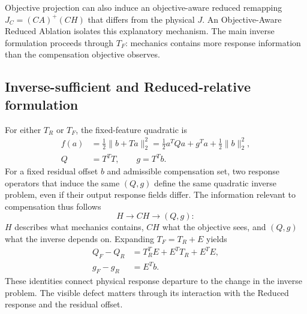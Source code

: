 Objective projection can also induce an objective-aware reduced remapping \(J_C=(CA)^+(CH)\) that differs from the physical \(J\). An Objective-Aware Reduced Ablation isolates this explanatory mechanism. The main inverse formulation proceeds through \(T_F\): mechanics contains more response information than the compensation objective observes.

\subsection{Inverse-sufficient and Reduced-relative formulation}
\label{sec:inverse_sufficient_relative}

For either \(T_R\) or \(T_F\), the fixed-feature quadratic is
\begin{equation}
\begin{aligned}
f(a)&=\frac12\|b+Ta\|_2^2
     =\frac12a^TQa+g^Ta+\frac12\|b\|_2^2,\\
Q&=T^TT,\qquad g=T^Tb.
\end{aligned}
\label{eq:inverse_sufficient}
\end{equation}
For a fixed residual offset \(b\) and admissible compensation set, two response operators that induce the same \((Q,g)\) define the same quadratic inverse problem, even if their output response fields differ. The information relevant to compensation thus follows
\[
H\longrightarrow CH\longrightarrow(Q,g):
\]
\(H\) describes what mechanics contains, \(CH\) what the objective sees, and \((Q,g)\) what the inverse depends on. Expanding \(T_F=T_R+E\) yields
\begin{equation}
\begin{aligned}
Q_F-Q_R&=T_R^TE+E^TT_R+E^TE,\\
g_F-g_R&=E^Tb.
\end{aligned}
\label{eq:visible_defect_inverse_bridge}
\end{equation}
These identities connect physical response departure to the change in the inverse problem. The visible defect matters through its interaction with the Reduced response and the residual offset.


